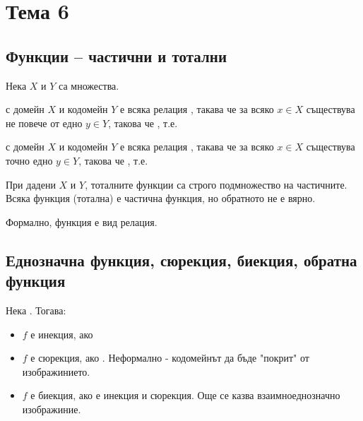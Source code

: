 \section{Тема 6}

\subsection{Функции – частични и тотални}
Нека \(X\) и \(Y\) са множества.

\begin{definition}
     с домейн \(X\) и кодомейн \(Y\) е всяка 
    релация , такава че за всяко \(x \in X\) съществува не повече от едно 
    \(y \in Y\), такова че , т.е.

\end{definition}

\begin{definition}
     с домейн \(X\) и кодомейн \(Y\) е всяка 
    релация , такава че за всяко \(x \in X\) съществува точно едно 
    \(y \in Y\), такова че , т.е.

\end{definition}

При дадени \(X\) и \(Y\), тоталните функции са строго подмножество на частичните.
Всяка функция (тотална) е частична функция, но обратното не е вярно.

Формално, функция е вид релация.

\subsection{Еднозначна функция, сюрекция, биекция, обратна функция}
Нека . Тогава: %
\begin{itemize}
    \item \(f\) е инекция, ако 
    \item \(f\) е сюрекция, ако . Неформално - кодомейнът да 
    бъде "покрит" от изображинието.
    \item \(f\) е биекция, ако е инекция и сюрекция. Още се казва взаимноеднозначно изображиние.
\end{itemize}

